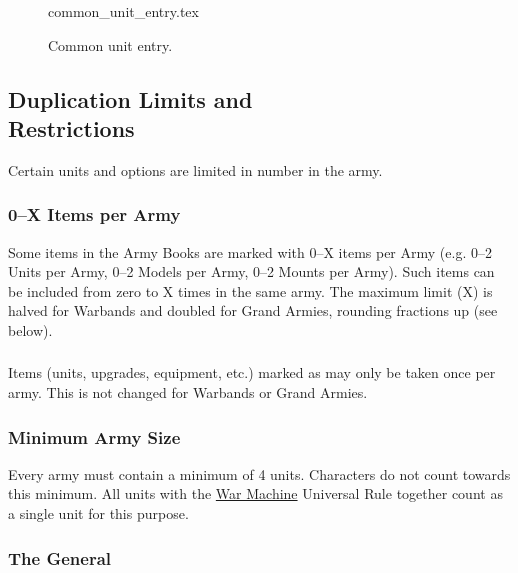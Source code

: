 \begin{figure}[!b]
	{common_unit_entry.tex}\vspace{-5pt}
	\caption{Common unit entry.}
	\label{figure/common_unit_entry}
	\vspace*{15pt}
\end{figure}

\subsection[Duplication Limits and Restrictions]{Duplication Limits and\\ Restrictions}
\label{duplication_limits}

Certain units and options are limited in number in the army.

\subsubsection{0--X Items per Army}

Some items in the Army Books are marked with 0--X items per Army (e.g. 0--2 Units per Army, 0--2 Models per Army, 0--2 Mounts per Army). Such items can be included from zero to X times in the same army. The maximum limit (X) is halved for Warbands and doubled for Grand Armies, rounding fractions up (see below).

\subsubsection{\oneofakind}

Items (units, upgrades, equipment, etc.) marked as \oneofakind{} may only be taken once per army. This is not changed for Warbands or Grand Armies.

\subsubsection{Minimum Army Size}

Every army must contain a minimum of 4 units. Characters do not count towards this minimum. All units with the \hyperref[war_machine]{War Machine} Universal Rule together count as a single unit for this purpose.

\subsubsection{The General}
\label{the_general}


